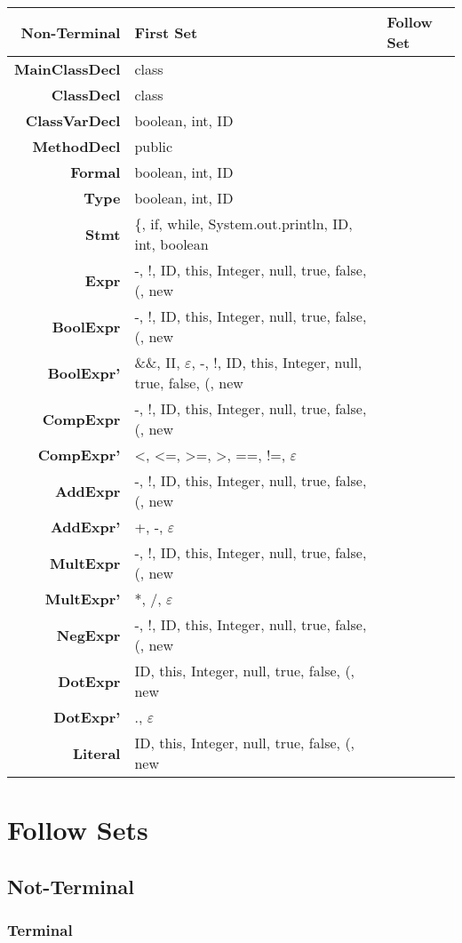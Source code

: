 \documentclass{report}
\begin{document}
%
\begin{tabularx}{\textwidth}{ r | R | R }

\textbf{Non-Terminal} & \textbf{First Set} & \textbf{Follow Set} \\
\hline
\textbf{MainClassDecl} & class \\ 
\textbf{ClassDecl} & class \\ 
\textbf{ClassVarDecl} & boolean, int, ID \\
\textbf{MethodDecl} & public \\
\textbf{Formal} & boolean, int, ID \\ 
\textbf{Type} & boolean, int, ID \\
\textbf{Stmt} & \{, if, while, System.out.println, ID, int, boolean \\
\textbf{Expr} & -, !, ID, this, Integer, null, true, false, (, new \\
\textbf{BoolExpr} & -, !, ID, this, Integer, null, true, false, (, new \\
\textbf{BoolExpr'} & \&\&, II, $\varepsilon$, -, !, ID, this, Integer, null, true, false, (, new \\
\textbf{CompExpr} & -, !, ID, this, Integer, null, true, false, (, new \\
\textbf{CompExpr'} & <, <=, >=, >, ==, !=, $\varepsilon$ \\
\textbf{AddExpr} & -, !, ID, this, Integer, null, true, false, (, new \\
\textbf{AddExpr'} & +, -, $\varepsilon$ \\
\textbf{MultExpr} & -, !, ID, this, Integer, null, true, false, (, new \\
\textbf{MultExpr'} & *, /, $\varepsilon$ \\
\textbf{NegExpr} &  -, !, ID, this, Integer, null, true, false, (, new \\
\textbf{DotExpr} & ID, this, Integer, null, true, false, (, new \\
\textbf{DotExpr'} & ., $\varepsilon$ \\
\textbf{Literal} & ID, this, Integer, null, true, false, (, new \\


\end{tabularx}

\newpage

\section*{Follow Sets}

\begin{multicols}{3}

\subsection*{Not-Terminal}
\subsubsection*{Terminal}

\end{multicols}
\end{document}
